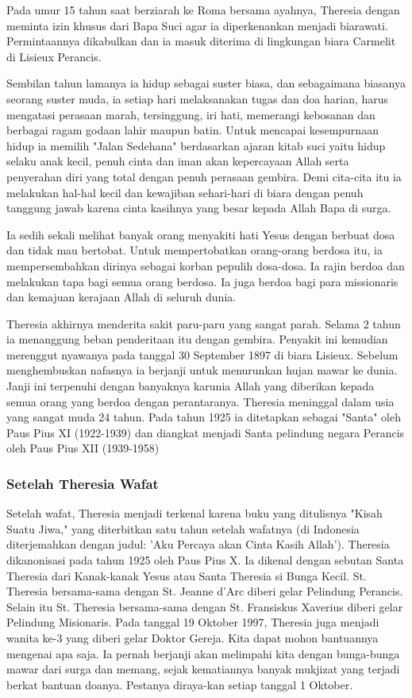 Pada umur 15 tahun saat berziarah ke Roma bersama ayahnya, Theresia dengan meminta izin khusus dari Bapa Suci agar ia diperkenankan menjadi biarawati. Permintaannya dikabulkan dan ia masuk diterima di lingkungan biara Carmelit di Lisieux Perancis.

Sembilan tahun lamanya ia hidup sebagai suster biasa, dan sebagaimana biasanya seorang suster muda, ia setiap hari melaksanakan tugas dan doa harian, harus mengatasi perasaan marah, tersinggung, iri hati, memerangi kebosanan dan berbagai ragam godaan lahir maupun batin. Untuk mencapai kesempurnaan hidup ia memilih "Jalan Sedehana" berdasarkan ajaran kitab suci yaitu hidup selaku anak kecil, penuh cinta dan iman akan kepercayaan Allah serta penyerahan diri yang total dengan penuh perasaan gembira. Demi cita-cita itu ia melakukan hal-hal kecil dan kewajiban sehari-hari di biara dengan penuh tanggung jawab karena cinta kasihnya yang besar kepada Allah Bapa di surga.

Ia sedih sekali melihat banyak orang menyakiti hati Yesus dengan berbuat dosa dan tidak mau bertobat. Untuk mempertobatkan orang-orang berdosa itu, ia mempersembahkan dirinya sebagai korban pepulih dosa-dosa. Ia rajin berdoa dan melakukan tapa bagi semua orang berdosa. Ia juga berdoa bagi para missionaris dan kemajuan kerajaan Allah di seluruh dunia.

Theresia akhirnya menderita sakit paru-paru yang sangat parah. Selama 2 tahun ia menanggung beban penderitaan itu dengan gembira. Penyakit ini kemudian merenggut nyawanya pada tanggal 30 September 1897 di biara Lisieux. Sebelum menghembuskan nafasnya ia berjanji untuk menurunkan hujan mawar ke dunia. Janji ini terpenuhi dengan banyaknya karunia Allah yang diberikan kepada semua orang yang berdoa dengan perantaranya. Theresia meninggal dalam usia yang sangat muda 24 tahun. Pada tahun 1925 ia ditetapkan sebagai "Santa" oleh Paus Pius XI (1922-1939) dan diangkat menjadi Santa pelindung negara Perancis oleh Paus Pius XII (1939-1958)

\subsubsection*{Setelah Theresia Wafat}

Setelah wafat, Theresia menjadi terkenal karena buku yang ditulisnya "Kisah Suatu Jiwa," yang diterbitkan satu tahun setelah wafatnya (di Indonesia diterjemahkan dengan judul: 'Aku Percaya akan Cinta Kasih Allah'). Theresia dikanonisasi pada tahun 1925 oleh Paus Pius X. Ia dikenal dengan sebutan Santa Theresia dari Kanak-kanak Yesus atau Santa Theresia si Bunga Kecil. St. Theresia bersama-sama dengan St. Jeanne d'Arc diberi gelar Pelindung Perancis. Selain itu St. Theresia bersama-sama dengan St. Fransiskus Xaverius diberi gelar Pelindung Misionaris.  Pada tanggal 19 Oktober 1997, Theresia juga menjadi wanita ke-3 yang diberi gelar Doktor Gereja. Kita dapat mohon bantuannya mengenai apa saja. Ia pernah berjanji  akan melimpahi kita dengan bunga-bunga mawar dari surga dan memang, sejak kematiannya banyak mukjizat yang terjadi berkat bantuan doanya. Pestanya diraya-kan setiap tanggal 1 Oktober.

